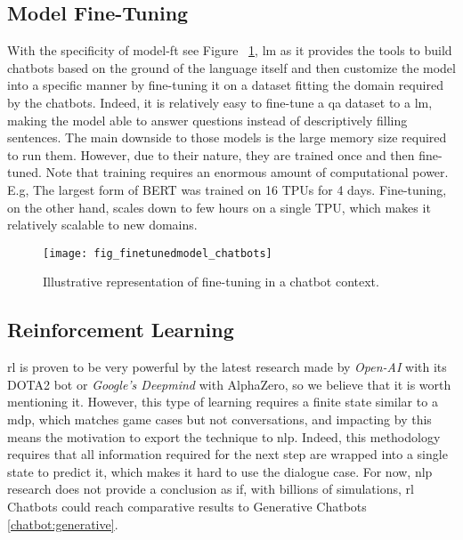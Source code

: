 \subsection{Model Fine-Tuning}
\label{chatbot:finetuning}
With the specificity of \gls{model-ft} see Figure ~\ref{fig:fig_finetunedmodel_chatbots}, \gls{lm} as it provides the tools to build chatbots based on the ground of the language itself and then customize the model into a specific manner by fine-tuning it on a dataset fitting the domain required by the chatbots. Indeed, it is relatively easy to fine-tune a \gls{qa} dataset to a \gls{lm}, making the model able to answer questions instead of descriptively filling sentences. The main downside to those models is the large memory size required to run them. However, due to their nature, they are trained once and then fine-tuned. Note that training requires an enormous amount of computational power. E.g, The largest form of BERT \autocite{paper:devlin-etal-2019-bert} was trained on 16 TPUs for 4 days. Fine-tuning, on the other hand, scales down to few hours on a single TPU, which makes it relatively scalable to new domains. 

\begin{figure}
    \centering
    \texttt{[image: fig\_finetunedmodel\_chatbots]}
    \caption{Illustrative representation of fine-tuning in a chatbot context.}
    \label{fig:fig_finetunedmodel_chatbots}
\end{figure}

\subsection{Reinforcement Learning}
\gls{rl} is proven to be very powerful by the latest research made by \textit{Open-AI} with its DOTA2 bot or \textit{Google's Deepmind} with AlphaZero, so we believe that it is worth mentioning it. However, this type of learning requires a finite state similar to a \gls{mdp}, which matches game cases but not conversations, and impacting by this means the motivation to export the technique to \gls{nlp}. Indeed, this methodology requires that all information required for the next step are wrapped into a single state to predict it, which makes it hard to use the dialogue case. For now, \gls{nlp} research does not provide a conclusion as if, with billions of simulations, \gls{rl} Chatbots could reach comparative results to Generative Chatbots \ref{chatbot:generative}.


